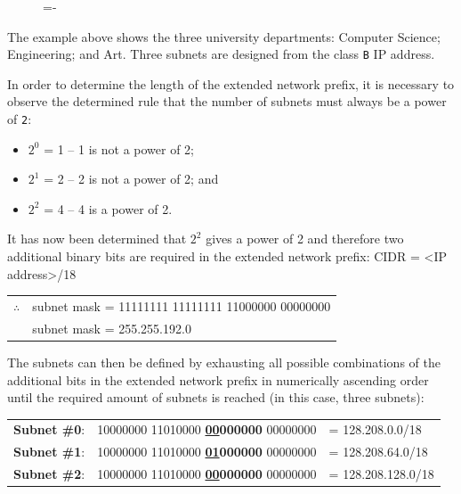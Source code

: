 \documentclass[a4paper]{systems-software}
\begin{document}
\begin{figure}[H]
	\lineskip=-\fboxrule
\end{figure}

The example above shows the three university departments: Computer Science; Engineering; and Art. Three subnets are designed from the class \texttt{B} IP address.

In order to determine the length of the extended network prefix, it is necessary to observe the determined rule that the number of subnets must always be a power of \texttt{2}:
\begin{itemize}
	\item $2^{0}$ = 1 -- 1 is not a power of 2;
	\item $2^{1}$ = 2 -- 2 is not a power of 2; and
	\item $2^{2}$ = 4 -- 4 is a power of 2.
\end{itemize}

It has now been determined that $2^{2}$ gives a power of 2 and therefore two additional binary bits are required in the extended network prefix:
CIDR = <IP address>/18
\begin{longtabu} to \textwidth {X[0.1,l] X[6,l]}
	$\therefore$ & subnet mask = 11111111 11111111 11000000 00000000 \\
	& subnet mask = 255.255.192.0 \\
\end{longtabu}

The subnets can then be defined by exhausting all possible combinations of the additional bits in the extended network prefix in numerically ascending order until the required amount of subnets is reached (in this case, three subnets):
\begin{longtabu} to \textwidth {X[0.5,l] X[2,l] X[1,l]}
	\textbf{Subnet \#0}: & 10000000 11010000 \textbf{\underline{00}000000} 00000000 & = 128.208.0.0/18 \\
	\textbf{Subnet \#1}: & 10000000 11010000 \textbf{\underline{01}000000} 00000000 & = 128.208.64.0/18 \\
	\textbf{Subnet \#2}: & 10000000 11010000 \textbf{\underline{00}000000} 00000000 & = 128.208.128.0/18 \\
\end{longtabu}
\end{document}
